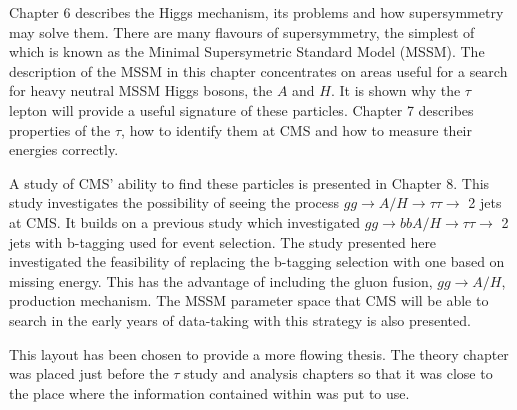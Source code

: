 Chapter 6 describes the Higgs mechanism, its problems and how supersymmetry may solve them. There are many flavours of supersymmetry, the simplest of which is known as the Minimal Supersymetric Standard Model (MSSM). The description of the MSSM in this chapter concentrates on areas useful for a search for heavy neutral MSSM Higgs bosons, the $A$ and $H$. It is shown why the $\tau$ lepton will provide a useful signature of these particles. Chapter 7 describes properties of the $\tau$, how to identify them at CMS and how to measure their energies correctly.

A study of CMS' ability to find these particles is presented in Chapter 8. This study investigates the possibility of seeing the process $gg \rightarrow A/H \rightarrow \tau \tau \rightarrow$ 2 jets at CMS. It builds on a previous study which investigated $gg \rightarrow bbA/H \rightarrow \tau \tau \rightarrow$ 2 jets with b-tagging used for event selection. The study presented here investigated the feasibility of replacing the b-tagging selection with one based on missing energy. This has the advantage of including the gluon fusion, $gg \rightarrow A/H$, production mechanism. The MSSM parameter space that CMS will be able to search in the early years of data-taking with this strategy is also presented. 

This layout has been chosen to provide a more flowing thesis. The theory chapter was placed just before the $\tau$ study and analysis chapters so that it was close to the place where the information contained within was put to use.